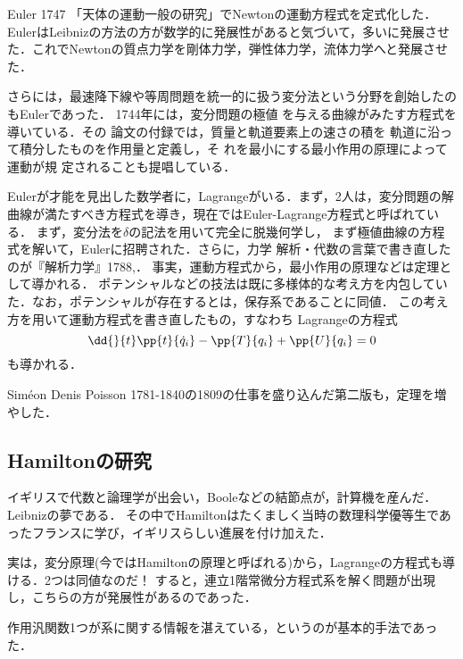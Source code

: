\documentclass[uplatex,dvipdfmx]{jsreport}
\begin{document}
\begin{history}
    Euler 1747 \cite{Euler1747}「天体の運動一般の研究」でNewtonの運動方程式を定式化した．
    EulerはLeibnizの方法の方が数学的に発展性があると気づいて，多いに発展させた．これでNewtonの質点力学を剛体力学，弾性体力学，流体力学へと発展させた．

    さらには，最速降下線や等周問題を統一的に扱う変分法という分野を創始したのもEulerであった．
    1744年には，変分問題の極値
    を与える曲線がみたす方程式を導いている．その
    論文の付録では，質量と軌道要素上の速さの積を
    軌道に沿って積分したものを作用量と定義し，そ
    れを最小にする最小作用の原理によって運動が規
    定されることも提唱している．
\end{history}

\begin{history}
    Eulerが才能を見出した数学者に，Lagrangeがいる．まず，2人は，変分問題の解曲線が満たすべき方程式を導き，現在ではEuler-Lagrange方程式と呼ばれている．
    まず，変分法を$\delta$の記法を用いて完全に脱幾何学し，
    まず極値曲線の方程式を解いて，Eulerに招聘された．さらに，力学
    解析・代数の言葉で書き直したのが『解析力学』1788,\cite{Lagrange1788}．
    事実，運動方程式から，最小作用の原理などは定理として導かれる．
    ポテンシャルなどの技法は既に多様体的な考え方を内包していた．なお，ポテンシャルが存在するとは，保存系であることに同値．
    この考え方を用いて運動方程式を書き直したもの，すなわち
    Lagrangeの方程式
    \[\dd{}{t}\pp{t}{\dot{q}_i}-\pp{T}{q_i}+\pp{U}{q_i}=0\]
    も導かれる．

    Siméon Denis Poisson 1781-1840の1809の仕事を盛り込んだ第二版も，定理を増やした．
\end{history}

\subsection{Hamiltonの研究}

\begin{tcolorbox}[colframe=ForestGreen, colback=ForestGreen!10!white,breakable,colbacktitle=ForestGreen!40!white,coltitle=black,fonttitle=\bfseries\sffamily,
title=]
    イギリスで代数と論理学が出会い，Booleなどの結節点が，計算機を産んだ．Leibnizの夢である．
    その中でHamiltonはたくましく当時の数理科学優等生であったフランスに学び，イギリスらしい進展を付け加えた．

    実は，変分原理(今ではHamiltonの原理と呼ばれる)から，Lagrangeの方程式も導ける．2つは同値なのだ！
    すると，連立1階常微分方程式系を解く問題が出現し，こちらの方が発展性があるのであった．

    作用汎関数1つが系に関する情報を湛えている，というのが基本的手法であった．
\end{tcolorbox}
\end{document}
